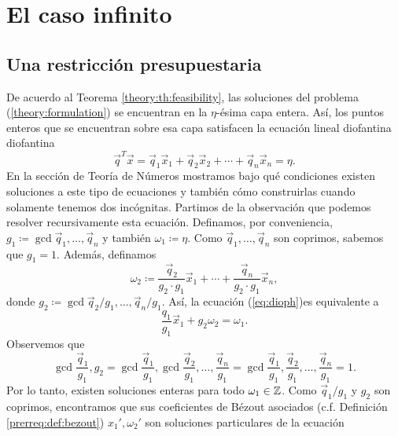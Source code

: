 \chapter{El caso infinito}


\section{Una restricción presupuestaria}
\noindent
De acuerdo al Teorema \ref{theory:th:feasibility}, las soluciones del problema
(\ref{theory:formulation}) se encuentran en la $\eta$-ésima capa entera. Así, los puntos enteros que
se encuentran sobre esa capa satisfacen la ecuación lineal diofantina
diofantina
\begin{equation}
	\label{eq:dioph}
	\vec{q}^T\vec{x} = \vec{q}_1\vec{x}_1 + \vec{q}_2\vec{x}_2 + \cdots + \vec{q}_n\vec{x}_n = \eta.
\end{equation}
En la sección de Teoría de Números mostramos bajo qué condiciones existen soluciones a este tipo de
ecuaciones y también cómo construirlas cuando solamente tenemos dos incógnitas. Partimos de la
observación que podemos resolver recursivamente esta ecuación. Definamos, por conveniencia,
$g_1 \coloneq \gcd{\vec{q}_1, \ldots, \vec{q}_n}$ y también $\omega_1 \coloneq \eta$. Como
$\vec{q}_1, \ldots, \vec{q}_n$ son coprimos, sabemos que $g_1 = 1$. Además, definamos
\begin{equation*}
	\omega_2 \coloneq \frac{\vec{q}_2}{g_2 \cdot g_1}\vec{x}_1 + \cdots + \frac{\vec{q}_n}{g_2 \cdot
	g_1}\vec{x}_n,
\end{equation*}
donde $g_2 \coloneq \gcd{\vec{q}_2/g_1, \ldots, \vec{q}_n/g_1}$. Así, la ecuación (\ref{eq:dioph})es
equivalente a
\begin{equation}
	\label{eq:dioph:first-step}
	\frac{q_1}{g_1}\vec{x}_1 + g_2\omega_2 = \omega_1.
\end{equation}
Observemos que
\begin{equation*}
	\gcd{\frac{\vec{q}_1}{g_1}, g_2}
	= \gcd{\frac{\vec{q}_1}{g_1}, \gcd{\frac{\vec{q}_2}{g_1}, \ldots, \frac{\vec{q}_n}{g_1}}}
	= \gcd{\frac{\vec{q}_1}{g_1}, \frac{\vec{q}_2}{g_1}, \ldots, \frac{\vec{q}_n}{g_1}} = 1.
\end{equation*}
Por lo tanto, existen soluciones enteras para todo $\omega_1 \in \mathbb{Z}$. Como $\vec{q}_1/g_1$ y $g_2$
son coprimos, encontramos que sus coeficientes de Bézout asociados (c.f. Definición
\ref{prerreq:def:bezout}) $x_1', \omega_2'$ son soluciones particulares de la ecuación
